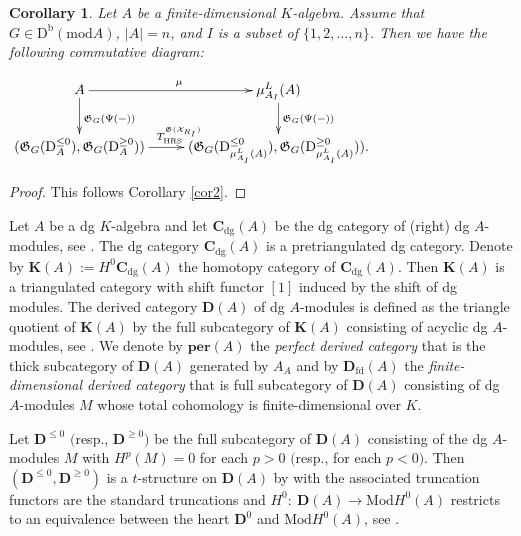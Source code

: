 \documentclass[11pt,a4paper]{amsart}
\numberwithin{equation}{section} \theoremstyle{plain}
\newtheorem{cor}[lem]{Corollary}
\numberwithin{equation}{section} \theoremstyle{definition}
\begin{document}
\begin{cor}\label{cor3} Let $A$ be a finite-dimensional $K$-algebra. Assume that $G\in\mathrm{D}^{\mathrm{b}}(\mathrm{mod}A)$, $|A|=n$, and $I$ is a subset of $\{1,2,\ldots,n\}$. Then we have the following commutative diagram:
\begin{center} $\xymatrix@C=25pt@R=20pt{
A\ar[d]^{\mathfrak{G}_{G}(\Psi(-))}\ar[r]^{\mu} &\mu_{A_{I}}^{L}(A)\ar[d]^{\mathfrak{G}_{G}(\Psi(-))}&\\
(\mathfrak{G}_{G}(\mathrm{D}^{\leq0}_{A}),\mathfrak{G}_{G}(\mathrm{D}^{\geq0}_{A}))\ar[r]^{T_{\mathrm{HRS}}^{\mathfrak{G}(\mathcal{X}_{R_{I}})}}& (\mathfrak{G}_{G}(\mathrm{D}^{\leq0}_{\mu_{A_{I}}^{L}(A)}),\mathfrak{G}_{G}(\mathrm{D}^{\geq0}_{\mu_{A_{I}}^{L}(A)})).&}$
\end{center}
\end{cor}
\begin{proof} This follows Corollary \ref{cor2}.
\end{proof}


Let $A$ be a dg $K$-algebra and let $\mathbf{C}_{\mathrm{dg}}(A)$ be the dg category of (right) dg $A$-modules, see
\cite[Section 3.1]{K}. The dg category $\mathbf{C}_{\mathrm{dg}}(A)$ is a pretriangulated dg category. Denote by $\mathbf{K}(A):=H^{0}\mathbf{C}_{\mathrm{dg}}(A)$ the homotopy category of $\mathbf{C}_{\mathrm{dg}}(A)$. Then $\mathbf{K}(A)$ is a triangulated category with shift functor $[1]$ induced by the shift of dg modules. The derived category $\mathbf{D}(A)$ of dg $A$-modules is defined as the triangle quotient of $\mathbf{K}(A)$ by the full subcategory of $\mathbf{K}(A)$ consisting of acyclic dg $A$-modules, see \cite[Section 2.2]{K}. We denote by $\mathbf{per}(A)$ the \emph{perfect derived category} that is the thick subcategory of $\mathbf{D}(A)$ generated by $A_{A}$ and by $\mathbf{D}_{\mathrm{fd}}(A)$ the \emph{finite-dimensional derived category} that is full subcategory of $\mathbf{D}(A)$ consisting of dg $A$-modules $M$ whose total cohomology is finite-dimensional over $K$.

Let $\mathbf{D}^{\leq0}$ $($resp., $\mathbf{D}^{\geq0})$ be the full subcategory of $\mathbf{D}(A)$ consisting of the dg $A$-modules $M$ with $H^{p}(M)=0$ for each $p>0$ $($resp., for each $p<0)$. Then $(\mathbf{D}^{\leq0},\mathbf{D}^{\geq0})$ is a $t$-structure on $\mathbf{D}(A)$ by \cite[Example 3.19]{AMY} with the associated truncation functors are the standard truncations and $H^{0}:~\mathbf{D}(A)\rightarrow \mathrm{Mod}H^{0}(A)$ restricts to an equivalence between the heart $\mathbf{D}^{0}$ and $\mathrm{Mod}H^{0}(A)$, see \cite[Section 2.1]{A}.
\end{document}

